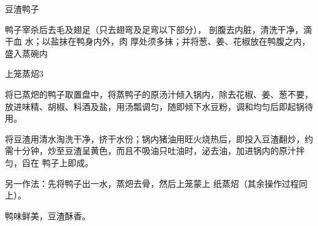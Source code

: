\begin{recipe}{豆渣鸭子}

\ingredients



\preparation

鸭子宰杀后去毛及翅足（只去翅弯及足弯以下部分）， 剖腹去内脏，清洗干净，滴干血
水；以盐抹在鸭身内外，肉 厚处须多抹；并将葱、姜、花椒放在鸭腹之内，盛入蒸碗内

上笼蒸炤3

\step 将已蒸𤆵的鸭子取置盘中，将蒸鸭子的原汤汁倾入锅内，除去花椒、姜、葱不要，
放进味精、胡椒、料酒及盐，用汤瓢调匀，随即倾下水豆粉，调和均匀后即起锅待用。

\step 将豆渣用清水淘洗干净，挤干水份；锅内猪油用旺火烧热后，即投入豆渣翻炒，约
需十分钟，炒至豆渣呈黄色，而且不吸油只吐油时，泌去油，加进锅内的原汁拌匀，舀在
鸭子上即成。

另一作法：先将鸭子出一水，蒸𤆵去骨，然后上笼蒙上 纸蒸炤（其余操作过程同上）。

\features

鸭味鲜美，豆渣酥香。

\end{recipe}

